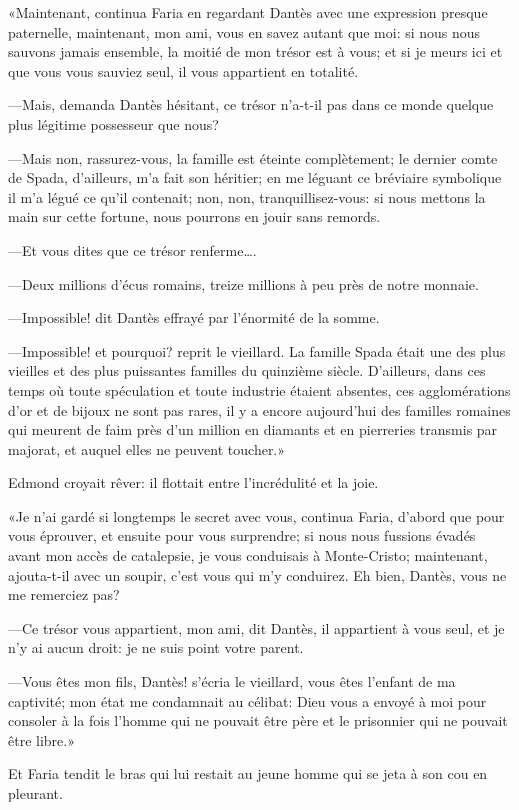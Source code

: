 «Maintenant, continua Faria en regardant Dantès avec une expression presque paternelle, maintenant, mon ami, vous en savez autant que moi: si nous nous sauvons jamais ensemble, la moitié de mon trésor est à vous; et si je meurs ici et que vous vous sauviez seul, il vous appartient en totalité.

—Mais, demanda Dantès hésitant, ce trésor n'a-t-il pas dans ce monde quelque plus légitime possesseur que nous?

—Mais non, rassurez-vous, la famille est éteinte complètement; le dernier comte de Spada, d'ailleurs, m'a fait son héritier; en me léguant ce bréviaire symbolique il m'a légué ce qu'il contenait; non, non, tranquillisez-vous: si nous mettons la main sur cette fortune, nous pourrons en jouir sans remords.

—Et vous dites que ce trésor renferme\dots.

—Deux millions d'écus romains, treize millions à peu près de notre monnaie.

—Impossible! dit Dantès effrayé par l'énormité de la somme.

—Impossible! et pourquoi? reprit le vieillard. La famille Spada était une des plus vieilles et des plus puissantes familles du quinzième siècle. D'ailleurs, dans ces temps où toute spéculation et toute industrie étaient absentes, ces agglomérations d'or et de bijoux ne sont pas rares, il y a encore aujourd'hui des familles romaines qui meurent de faim près d'un million en diamants et en pierreries transmis par majorat, et auquel elles ne peuvent toucher.»

Edmond croyait rêver: il flottait entre l'incrédulité et la joie.

«Je n'ai gardé si longtemps le secret avec vous, continua Faria, d'abord que pour vous éprouver, et ensuite pour vous surprendre; si nous nous fussions évadés avant mon accès de catalepsie, je vous conduisais à Monte-Cristo; maintenant, ajouta-t-il avec un soupir, c'est vous qui m'y conduirez. Eh bien, Dantès, vous ne me remerciez pas?

—Ce trésor vous appartient, mon ami, dit Dantès, il appartient à vous seul, et je n'y ai aucun droit: je ne suis point votre parent.

—Vous êtes mon fils, Dantès! s'écria le vieillard, vous êtes l'enfant de ma captivité; mon état me condamnait au célibat: Dieu vous a envoyé à moi pour consoler à la fois l'homme qui ne pouvait être père et le prisonnier qui ne pouvait être libre.»

Et Faria tendit le bras qui lui restait au jeune homme qui se jeta à son cou en pleurant.




